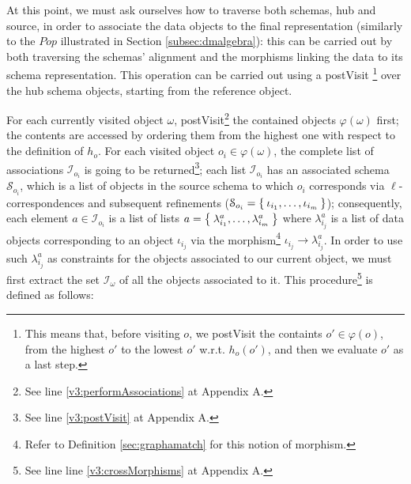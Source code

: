 \begin{example}[continues=ex:examplegraphdata,label=ex:examplereferencedOcaml]
At this point, we must ask ourselves how to traverse both schemas,  hub and source, in order to associate the data objects to the final representation (similarly to the $Pop$ illustrated in Section \vref{subsec:dmalgebra}): this can be carried out by both traversing the schemas' alignment and the morphisms linking the data to its schema representation. This operation can be carried out using a postVisit \footnote{This means that, before visiting $o$, we postVisit the containts $o'\in\varphi(o)$, from the highest $o'$ to the lowest $o'$ w.r.t. $h_o(o')$, and then we evaluate $o'$ as a last step.} over the hub schema objects, starting from the reference object. 

For each currently visited object $\omega$, postVisit\footnote{See  line \vref{v3:performAssociations} at Appendix A.} the contained objects $\varphi(\omega)$ first; the contents are accessed by ordering them from the highest one with respect to the definition of $h_o$. For each visited object $o_i\in\varphi(\omega)$, the complete list of associations $\mathcal{I}_{o_i}$ is going to be returned\footnote{See line \vref{v3:postVisit} at Appendix A.}; each list $\mathcal{I}_{o_i}$ has an associated schema $\mathcal{S}_{o_i}$, which is a list of objects in the source schema to which $o_i$ corresponds via $\ell$-correspondences and subsequent refinements ($\mathcal{S}_{o_i}=\Set{\iota_{i_1},\dots,\iota_{i_m}}$); consequently, each element  $a\in \mathcal{I}_{o_i}$ is a list of lists $a=\Set{\lambda_{i_1}^a,\dots,\lambda_{i_m}^a }$ where $\lambda_{i_j}^a$ is a list of data objects corresponding to an object $\iota_{i_j}$ via the morphism\footnote{Refer to Definition \vref{sec:graphamatch} for this notion of morphism.} ${\iota_{i_j}}\to \lambda_{i_j}^a$. In order to use such $\lambda_{i_j}^a$ as constraints for the objects associated to our current object, we must first extract the set $\mathcal{I}_\omega$ of all the objects associated to it. This procedure\footnote{See line line \vref{v3:crossMorphisms} at Appendix A.} is defined as follows:
\medskip

	


\end{example}
